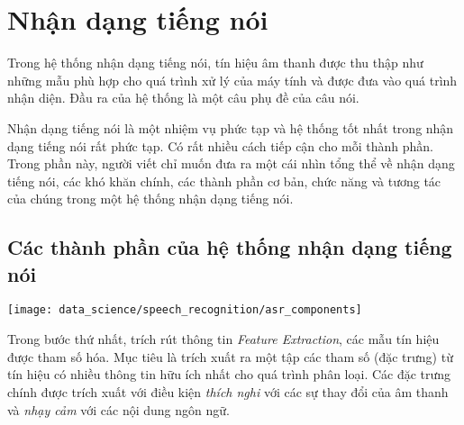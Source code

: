 \chapter{Nhận dạng tiếng nói}




Trong hệ thống nhận dạng tiếng nói, tín hiệu âm thanh được thu thập như những mẫu phù hợp cho quá trình xử lý của máy tính và được đưa vào quá trình nhận diện. Đầu ra của hệ thống là một câu phụ đề của câu nói.

Nhận dạng tiếng nói là một nhiệm vụ phức tạp và hệ thống tốt nhất trong nhận dạng tiếng nói rất phức tạp. Có rất nhiều cách tiếp cận cho mỗi thành phần. Trong phần này, người viết chỉ muốn đưa ra một cái nhìn tổng thể về nhận dạng tiếng nói, các khó khăn chính, các thành phần cơ bản, chức năng và tương tác của chúng trong một hệ thống nhận dạng tiếng nói.

\section{Các thành phần của hệ thống nhận dạng tiếng nói}

\texttt{[image: data\_science/speech\_recognition/asr\_components]}

Trong bước thứ nhất, trích rút thông tin \textit{Feature Extraction}, các mẫu tín hiệu được tham số hóa. Mục tiêu là trích xuất ra một tập các tham số (đặc trưng) từ tín hiệu có nhiều thông tin hữu ích nhất cho quá trình phân loại.  Các đặc trưng chính được trích xuất với điều kiện \textit{thích nghi} với các sự thay đổi của âm thanh và \textit{nhạy cảm} với các nội dung ngôn ngữ.

